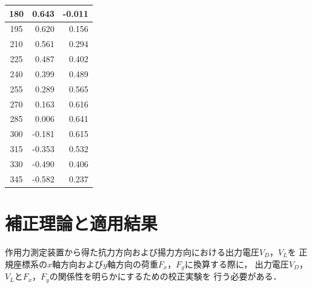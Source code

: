 \documentclass[twocolumn,a4j]{jsarticle}
\begin{document}
\begin{table}[htbp]
\begin{center}
\begin{tabular}{|p{20mm}|p{20mm}|p{20mm}|}
            \multicolumn{1}{|c|}{180}                & \multicolumn{1}{|r|}{0.643}            & \multicolumn{1}{|r|}{-0.011} \\ \hline
            \multicolumn{1}{|c|}{195}                & \multicolumn{1}{|r|}{0.620}            & \multicolumn{1}{|r|}{0.156} \\ \hline
            \multicolumn{1}{|c|}{210}                & \multicolumn{1}{|r|}{0.561}            & \multicolumn{1}{|r|}{0.294} \\ \hline
            \multicolumn{1}{|c|}{225}                & \multicolumn{1}{|r|}{0.487}            & \multicolumn{1}{|r|}{0.402} \\ \hline
            \multicolumn{1}{|c|}{240}                & \multicolumn{1}{|r|}{0.399}            & \multicolumn{1}{|r|}{0.489} \\ \hline
            \multicolumn{1}{|c|}{255}                & \multicolumn{1}{|r|}{0.289}            & \multicolumn{1}{|r|}{0.565} \\ \hline
            \multicolumn{1}{|c|}{270}                & \multicolumn{1}{|r|}{0.163}            & \multicolumn{1}{|r|}{0.616} \\ \hline
            \multicolumn{1}{|c|}{285}                & \multicolumn{1}{|r|}{0.006}            & \multicolumn{1}{|r|}{0.641} \\ \hline
            \multicolumn{1}{|c|}{300}                & \multicolumn{1}{|r|}{-0.181}           & \multicolumn{1}{|r|}{0.615} \\ \hline
            \multicolumn{1}{|c|}{315}                & \multicolumn{1}{|r|}{-0.353}           & \multicolumn{1}{|r|}{0.532} \\ \hline
            \multicolumn{1}{|c|}{330}                & \multicolumn{1}{|r|}{-0.490}           & \multicolumn{1}{|r|}{0.406} \\ \hline
            \multicolumn{1}{|c|}{345}                & \multicolumn{1}{|r|}{-0.582}           & \multicolumn{1}{|r|}{0.237} \\ \hline
        \end{tabular}
    \end{center}
\end{table}

\newpage

\section{補正理論と適用結果}

作用力測定装置から得た抗力方向および揚力方向における出力電圧$V_D$，$V_L$を
正規座標系の$x$軸方向および$y$軸方向の荷重$F_x$，$F_y$に換算する際に，
出力電圧$V_D$，$V_L$と$F_x$，$F_y$の関係性を明らかにするための校正実験を
行う必要がある．\\
\end{document}
